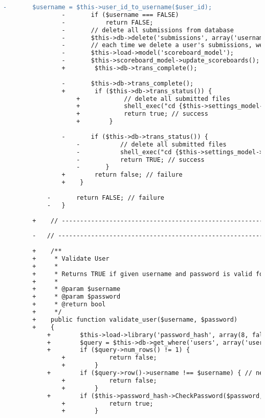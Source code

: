 \begin{lstlisting}[language=diff, caption=Perubahan pada kode User\_model.php]
				-		$username = $this->user_id_to_username($user_id);
				-		if ($username === FALSE)
				-			return FALSE;
				-		// delete all submissions from database
				-		$this->db->delete('submissions', array('username'=>$username));
				-		// each time we delete a user's submissions, we should update all scoreboards
				-		$this->load->model('scoreboard_model');
				-		$this->scoreboard_model->update_scoreboards();
				+        $this->db->trans_complete();
				
				-		$this->db->trans_complete();
				+        if ($this->db->trans_status()) {
					+            // delete all submitted files
					+            shell_exec("cd {$this->settings_model->get_setting('assignments_root')}; rm -r */*/{$username};");
					+            return true; // success
					+        }
				
				-		if ($this->db->trans_status()) {
					-			// delete all submitted files
					-			shell_exec("cd {$this->settings_model->get_setting('assignments_root')}; rm -r */*/{$username};");
					-			return TRUE; // success
					-		}
				+        return false; // failure
				+    }
			
			-		return FALSE; // failure
			-	}
		
		+    // ------------------------------------------------------------------------
		
		-	// ------------------------------------------------------------------------
		
		+    /**
		+     * Validate User
		+     *
		+     * Returns TRUE if given username and password is valid for login
		+     *
		+     * @param $username
		+     * @param $password
		+     * @return bool
		+     */
		+    public function validate_user($username, $password)
		+    {
			+        $this->load->library('password_hash', array(8, false));
			+        $query = $this->db->get_where('users', array('username' => $username));
			+        if ($query->num_rows() != 1) {
				+            return false;
				+        }
			+        if ($query->row()->username !== $username) { // needed (because of utf8_general_ci [ci=case insensitive])
				+            return false;
				+        }
			+        if ($this->password_hash->CheckPassword($password, $query->row()->password)) {
				+            return true;
				+        }
			

\end{lstlisting}
